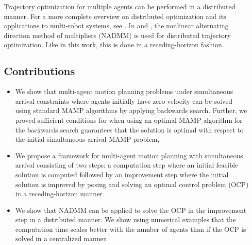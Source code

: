 \documentclass[letterpaper, 10 pt, conference]{ieeeconf}  %
\begin{document}
Trajectory optimization for multiple agents can be performed in a distributed manner. For a more complete overview on distributed optimization and its applications to multi-robot systems, see \cite{yang2019survey, halsted2021survey}. In \cite{ferranti2022distributed} and \cite{tran2024parallel}, the nonlinear alternating direction method of multipliers (NADMM) \cite{themelis2020douglas} is used for distributed trajectory optimization. Like in this work, this is done in a receding-horizon fashion. 

\subsection{Contributions}

\begin{itemize}
\item We show that multi-agent motion planning problems under simultaneous arrival constraints where agents initially have zero velocity can be solved using standard MAMP algorithms by applying backwards search. Further, we proved sufficient conditions for when using an optimal MAMP algorithm for the backwards search guarantees that the solution is optimal with respect to the initial simultaneous arrival MAMP problem,
\item We propose a framework for multi-agent motion planning with simultaneous arrival consisting of two steps: a computation step where an initial feasible solution is computed followed by an improvement step  where the initial solution is improved by posing and solving an optimal control problem (OCP) in a receding-horizon manner.
\item We show that NADMM can be applied to solve the OCP in the improvement step in a distributed manner. We show using numerical examples that the computation time scales better with the number of agents than if the OCP is solved in a centralized manner.
\end{itemize}
\end{document}
